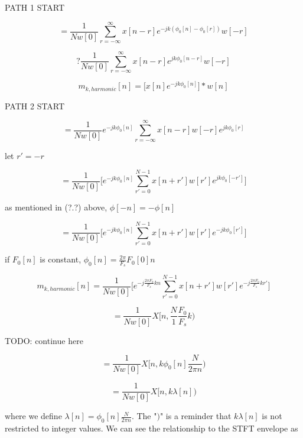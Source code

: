 \documentclass [11pt, proquest] {uwthesis}[2015/03/03]
\begin{document}
PATH 1 START

$$= \frac{1}{Nw[0]} \sum_{r = -\infty}^\infty x[n - r] e^{-jk (\phi_0[n] - \phi_0[r])} w[-r]$$

$$? \frac{1}{Nw[0]} \sum_{r = -\infty}^\infty x[n - r] e^{jk \phi_0[n-r]} w[-r]$$

$$m_{k,harmonic}[n] =  \Big[ x[n] e^{-jk \phi_0[n]} \Big] * w[n]$$


PATH 2 START

$$=  \frac{1}{Nw[0]} e^{-jk \phi_0[n]} \sum_{r = -\infty}^\infty x[n - r] w[-r] e^{jk \phi_0[r]}$$

let $r' = -r$

$$= \frac{1}{Nw[0]} \bigg[ e^{-jk \phi_0[n]} \sum_{r' = 0}^{N-1} x[n + r'] w[r'] e^{jk \phi_0[-r']} \bigg]$$

as mentioned in (?.?) above, $\phi[-n] = -\phi[n]$

$$= \frac{1}{Nw[0]} \bigg[ e^{-jk \phi_0[n]} \sum_{r' = 0}^{N-1} x[n + r'] w[r'] e^{-jk \phi_0[r']} \bigg]$$

if $F_0[n]$ is constant, $\phi_0[n] = \frac{2\pi}{F_s} F_0[0]n$

$$m_{k,harmonic}[n]  = \frac{1}{Nw[0]} \bigg[ e^{-j\frac{2\pi F_0}{F_s} kn} \sum_{r' = 0}^{N-1} x[n + r'] w[r'] e^{-j\frac{2\pi F_0}{F_s} kr'} \bigg]$$

$$= \frac{1}{Nw[0]} X[n, \frac{N}{1} \frac{F_0}{F_s} k)$$


TODO: continue here






$$= \frac{1}{Nw[0]} X[n, k \phi_0[n] \frac{N}{2\pi n})$$

$$= \frac{1}{Nw[0]} X[n, k\lambda[n])$$

where we define $\lambda[n] = \phi_0[n] \frac{N}{2\pi n}$.  The "$)$" is a reminder that $k\lambda [n]$ is not restricted to integer values.  We can see the relationship to the STFT envelope as
\end{document}
